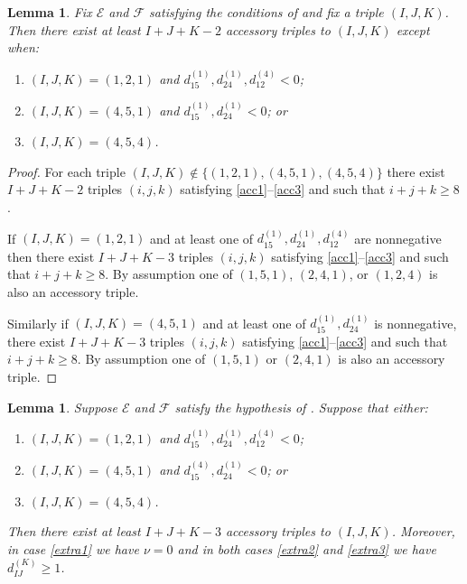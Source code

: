 \documentclass[11pt]{amsart}
\numberwithin{theorem}{section}
\numberwithin{equation}{section}
\newtheorem{lemma}[theorem]{Lemma}
\theoremstyle{definition}\newtheorem{defn}[theorem]{Definition}
\theoremstyle{definition}\newtheorem{remark}[theorem]{Remark}
\theoremstyle{definition}\newtheorem{question}[theorem]{Question}
\theoremstyle{definition}\newtheorem{problem}[theorem]{Problem}
\newcommand{\cE}{\mathcal{E}}
\newcommand{\cF}{\mathcal{F}}
\newcommand{\I}{I}
\newcommand{\J}{J}
\newcommand{\K}{K}
\begin{document}
\begin{lemma}
\label{lem:satisfying-numerical-criterion}
Fix $\cE$ and $\cF$ satisfying the conditions of  and fix a triple $(\I,\J,\K)$. Then there exist at least $\I+\J+\K-2$ accessory triples to $(\I,\J,\K)$ except when:
\begin{enumerate}[label=(\roman*)]
    \item \label{sat-num-crit-1} $(\I,\J,\K) = (1,2,1)$ and $d_{15}^{(1)}, d_{24}^{(1)}, d_{12}^{(4)} < 0$;
    \item \label{sat-num-crit-2} $(\I,\J,\K) = (4,5,1)$ and $d_{15}^{(1)},d_{24}^{(1)} < 0$; or
    \item $(\I,\J,\K) = (4,5,4)$.
\end{enumerate}
\end{lemma}
\begin{proof}
For each triple $(\I,\J,\K)\notin \{(1,2,1),(4,5,1),(4,5,4)\}$ there exist $\I+\J+\K-2$ triples $(i,j,k)$ satisfying \ref{acc1}--\ref{acc3} and such that $i + j + k \geq 8$. 

If $(\I,\J,\K) = (1,2,1)$ and at least one of $d_{15}^{(1)}, d_{24}^{(1)}, d_{12}^{(4)}$ are nonnegative then there exist $\I+\J+\K-3$  triples $(i,j,k)$ satisfying \ref{acc1}--\ref{acc3} and such that $i + j + k \geq 8$. By assumption one of $(1,5,1)$, $(2,4,1)$, or $(1,2,4)$ is also an accessory triple.

Similarly if $(\I,\J,\K) = (4,5,1)$ and at least one of $d_{15}^{(1)},d_{24}^{(1)}$ is nonnegative, there exist $\I+\J+\K-3$  triples $(i,j,k)$ satisfying \ref{acc1}--\ref{acc3} and such that $i + j + k \geq 8$. By assumption one of $(1,5,1)$ or $(2,4,1)$ is also an accessory triple.
\end{proof}

\begin{lemma}
\label{lem:extras}
Suppose $\cE$ and $\cF$ satisfy the hypothesis of . Suppose that either:
\begin{enumerate}[label=(\roman*)]
    \item \label{extra1} $(\I,\J,\K) = (1,2,1)$ and $d_{15}^{(1)}, d_{24}^{(1)}, d_{12}^{(4)} < 0$;
    \item \label{extra2} $(\I,\J,\K) = (4,5,1)$ and $d_{15}^{(4)}, d_{24}^{(1)} < 0$; or
    \item \label{extra3} $(\I,\J,\K) = (4,5,4)$.
\end{enumerate}
Then there exist at least $\I + \J + \K - 3$ accessory triples to $(\I,\J,\K)$. Moreover, in case \ref{extra1} we have $\nu = 0$ and in both cases \ref{extra2} and \ref{extra3} we have $d_{\I\J}^{(\K)} \geq 1$.
\end{lemma}
\end{document}
